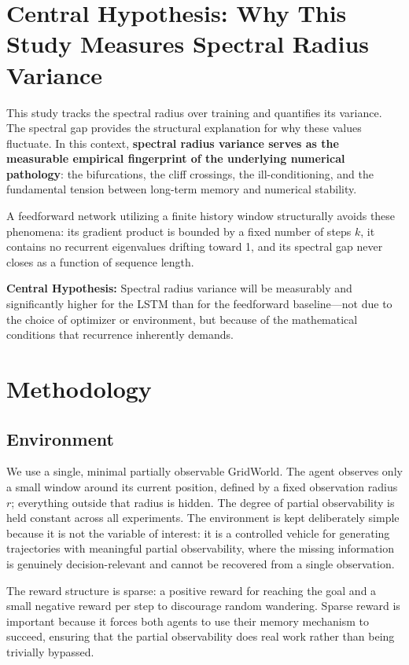 \documentclass[11pt,a4paper]{article}
\begin{document}
\section{Central Hypothesis: Why This Study Measures Spectral Radius Variance}
This study tracks the spectral radius over training and quantifies its variance. The spectral gap provides the structural explanation for why these values fluctuate. In this context, \textbf{spectral radius variance serves as the measurable empirical fingerprint of the underlying numerical pathology}: the bifurcations, the cliff crossings, the ill-conditioning, and the fundamental tension between long-term memory and numerical stability.

A feedforward network utilizing a finite history window structurally avoids these phenomena: its gradient product is bounded by a fixed number of steps $k$, it contains no recurrent eigenvalues drifting toward 1, and its spectral gap never closes as a function of sequence length.

\textbf{Central Hypothesis:} Spectral radius variance will be measurably and significantly higher for the LSTM than for the feedforward baseline---not due to the choice of optimizer or environment, but because of the mathematical conditions that recurrence inherently demands.


\section{Methodology}

\subsection{Environment}

We use a single, minimal partially observable GridWorld. The agent observes only a small window around its current position, defined by a fixed observation radius $r$; everything outside that radius is hidden. The degree of partial observability is held constant across all experiments. The environment is kept deliberately simple because it is not the variable of interest: it is a controlled vehicle for generating trajectories with meaningful partial observability, where the missing information is genuinely decision-relevant and cannot be recovered from a single observation.

The reward structure is sparse: a positive reward for reaching the goal and a small negative reward per step to discourage random wandering. Sparse reward is important because it forces both agents to use their memory mechanism to succeed, ensuring that the partial observability does real work rather than being trivially bypassed.
\end{document}
